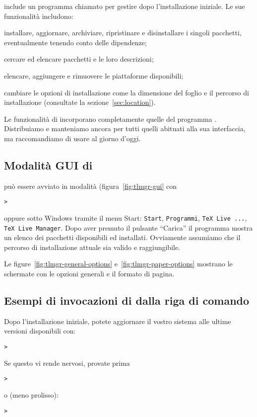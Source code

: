 \documentclass{article}
\begin{document}
\TL{} include un programma chiamato  per gestire \TL{} dopo
l'installazione iniziale. Le sue funzionalità includono:

\begin{itemize*}
\item installare, aggiornare, archiviare, ripristinare e disinstallare i
  singoli pacchetti, eventualmente tenendo conto delle dipendenze;
\item cercare ed elencare pacchetti e le loro descrizioni;
\item elencare, aggiungere e rimuovere le piattaforme disponibili;
\item cambiare le opzioni di installazione come la dimensione del foglio e
  il percorso di installazione (consultate la sezione~\ref{sec:location}).
\end{itemize*}

Le funzionalità di  incorporano completamente quelle del
programma . Distribuiamo e manteniamo ancora
 per tutti quelli abituati alla sua interfaccia, ma
raccomandiamo di usare  al giorno d'oggi.

\subsection{Modalità GUI di }
 può essere avviato in modalità \GUI{}
(figura~\ref{fig:tlmgr-gui} con
\begin{alltt}
> 
\end{alltt}
oppure sotto Windows tramite il menu Start: \texttt{Start},
\texttt{Programmi}, \texttt{TeX Live ...}, \texttt{TeX Live Manager}.
Dopo aver premuto il pulsante ``Carica'' il programma mostra un elenco dei
pacchetti disponibili ed installati. Ovviamente assumiamo che il percorso
di installazione attuale sia valido e raggiungibile.

Le figure~\ref{fig:tlmgr-general-options} e~\ref{fig:tlmgr-paper-options}
mostrano le schermate con le opzioni generali e il formato di pagina.

\subsection{Esempi di invocazioni di  dalla riga di comando}

Dopo l'installazione iniziale, potete aggiornare il vostro sistema alle
ultime versioni disponibili con:
\begin{alltt}
> 
\end{alltt}
Se questo vi rende nervosi, provate prima
\begin{alltt}
> 
\end{alltt}
o (meno prolisso):
\begin{alltt}
> 
\end{alltt}
\end{document}
